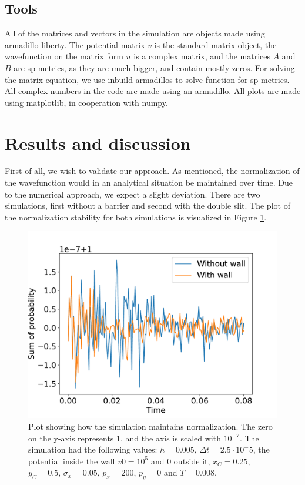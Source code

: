 \documentclass[english,notitlepage,reprint,nofootinbib]{revtex4-1}  %
\begin{document}
\subsection{Tools}
All of the matrices and vectors in the simulation are objects made using armadillo liberty. The potential matrix $v$ is the standard matrix object, the wavefunction on the matrix form $u$ is a complex matrix, and the matrices $A$ and $B$ are sp metrics, as they are much bigger, and contain mostly zeros. For solving the matrix equation, we use inbuild armadillos to solve function for sp metrics. All complex numbers in the code are made using an armadillo. All plots are made using matplotlib, in cooperation with numpy. 





\section{Results and discussion}\label{sec:results_and_discussion}

First of all, we wish to validate our approach. As mentioned, the normalization of the wavefunction would in an analytical situation be maintained over time. Due to the numerical approach, we expect a slight deviation. There are two simulations, first without a barrier and second with the double slit. The plot of the normalization stability for both simulations is visualized in Figure \ref{fig:1}.

\begin{figure}[h!]
    \centering %
    \includegraphics[scale=0.4]{figures/normlization_error.pdf} %
    \caption{Plot showing how the simulation maintains normalization. The zero on the y-axis represents 1, and the axis is scaled with $10^{-7}$. The simulation had the following values: $h=0.005$, $\Delta t = 2.5\cdot 10^-5$, the potential inside the wall $v0 = 10^5$ and $0$ outside it, $x_C = 0.25$, $y_C = 0.5$, $\sigma _x = 0.05$, $p_x = 200$, $p_y = 0$ and $T = 0.008$.}
    \label{fig:1}
\end{figure}
\end{document}
